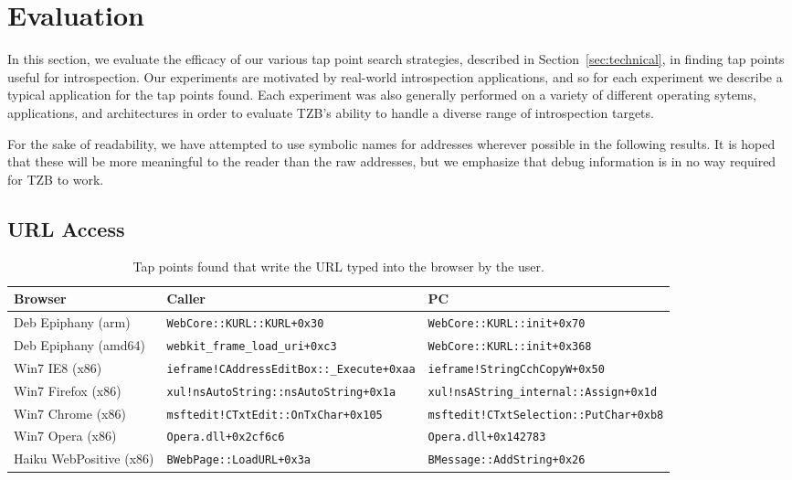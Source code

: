 \section{Evaluation}
\label{sec:eval}

In this section, we evaluate the efficacy of our various tap point search
strategies, described in Section~\ref{sec:technical}, in finding tap
points useful for introspection. Our experiments are motivated by
real-world introspection applications, and so for each experiment we
describe a typical application for the tap points found. Each experiment
was also generally performed on a variety of different operating sytems,
applications, and architectures in order to evaluate TZB's ability to
handle a diverse range of introspection targets.

For the sake of readability, we have attempted to use symbolic names for
addresses wherever possible in the following results. It is hoped that
these will be more meaningful to the reader than the raw addresses, but
we emphasize that debug information is in no way required for TZB to
work.

\subsection{URL Access}
\label{sec:eval:subsec:url}

\begin{table*}
    \centering
    \small
    \begin{tabular}{|l|l|l|}
        \hline
        Browser & Caller & PC \\
        \hline
        Deb Epiphany (arm) & \texttt{WebCore::KURL::KURL+0x30} & \texttt{WebCore::KURL::init+0x70} \\
        Deb Epiphany (amd64) & \texttt{webkit\_frame\_load\_uri+0xc3} & \texttt{WebCore::KURL::init+0x368} \\ 
        Win7 IE8 (x86) & \texttt{ieframe!CAddressEditBox::\_Execute+0xaa} & \texttt{ieframe!StringCchCopyW+0x50} \\
        Win7 Firefox (x86) & \texttt{xul!nsAutoString::nsAutoString+0x1a} & \texttt{xul!nsAString\_internal::Assign+0x1d} \\
        Win7 Chrome (x86) &  \texttt{msftedit!CTxtEdit::OnTxChar+0x105} & \texttt{msftedit!CTxtSelection::PutChar+0xb8} \\
        Win7 Opera (x86) &  \texttt{Opera.dll+0x2cf6c6} & \texttt{Opera.dll+0x142783} \\
        Haiku WebPositive (x86) & \texttt{BWebPage::LoadURL+0x3a} & \texttt{BMessage::AddString+0x26} \\
        \hline
    \end{tabular}
\caption{Tap points found that write the URL typed into the browser by
the user.}
\label{tbl:url}
\end{table*}

